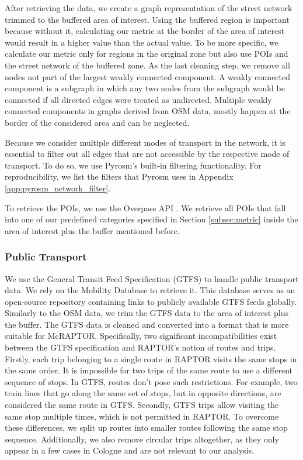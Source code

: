After retrieving the data, we create a graph representation of the street network trimmed to the buffered area of interest.
Using the buffered region is important because without it, calculating our metric at the border of the area of interest would result in a higher value than the actual value.
To be more specific, we calculate our metric only for regions in the original zone but also use POIs and the street network of the buffered zone.
As the last cleaning step, we remove all nodes not part of the largest weakly connected component.
A weakly connected component is a subgraph in which any two nodes from the subgraph would be connected if all directed edges were treated as undirected.
Multiple weakly connected components in graphs derived from OSM data, mostly happen at the border of the considered area and can be neglected.

Because we consider multiple different modes of transport in the network, it is essential to filter out all edges that are not accessible by the respective mode of transport.
To do so, we use Pyrosm's built-in filtering functionality.
For reproducibility, we list the filters that Pyrosm uses in Appendix \ref{app:pyrosm_network_filter}.

To retrieve the POIs, we use the Overpass API .
We retrieve all POIs that fall into one of our predefined categories specified in Section \ref{subsec:metric} inside the area of interest plus the buffer mentioned before.

\subsubsection{Public Transport}
\label{subs:public_transport}

We use the General Transit Feed Specification (GTFS)  to handle public transport data.
We rely on the Mobility Database  to retrieve it.
This database serves as an open-source repository containing links to publicly available GTFS feeds globally.
Similarly to the OSM data, we trim the GTFS data to the area of interest plus the buffer.
The GTFS data is cleaned and converted into a format that is more suitable for McRAPTOR.
Specifically, two significant incompatibilities exist between the GTFS specification and RAPTOR's notion of routes and trips.
Firstly, each trip belonging to a single route in RAPTOR visits the same stops in the same order.
It is impossible for two trips of the same route to use a different sequence of stops.
In GTFS, routes don't pose such restrictions.
For example, two train lines that go along the same set of stops, but in opposite directions, are considered the same route in GTFS.
Secondly, GTFS trips allow visiting the same stop multiple times, which is not permitted in RAPTOR.
To overcome these differences, we split up routes into smaller routes following the same stop sequence.
Additionally, we also remove circular trips altogether, as they only appear in a few cases in Cologne and are not relevant to our analysis.

